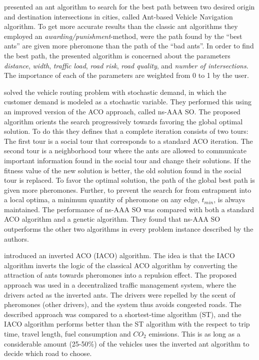 \citet{salehi-nezhad07} presented an ant algorithm to search for the best path between two desired origin and destination intersections in cities, called Ant-based Vehicle Navigation algorithm. To get more accurate results than the classic ant algorithms they employed an \textit{awarding/punishment}-method, were the path found by the ``best ants'' are given more pheromone than the path of the ``bad ants''. In order to find the best path, the presented algorithm is concerned about the parameters \textit{distance}, \textit{width}, \textit{traffic load}, \textit{road risk}, \textit{road quality}, and \textit{number of intersections}. The importance of each of the parameters are weighted from 0 to 1 by the user. 

\citet{tripathi09} solved the vehicle routing problem with stochastic demand, in which the customer demand is modeled as a stochastic variable. They performed this using an improved version of the ACO approach, called ns-AAA SO. The proposed algorithm orients the search progressively towards favoring the global optimal solution. To do this they defines that a complete iteration consists of two tours: The first tour is a social tour that corresponds to a standard ACO iteration. The second tour is a neighborhood tour where the ants are allowed to communicate important information found in the social tour and change their solutions. If the fitness value of the new solution is better, the old solution found in the social tour is replaced. To favor the optimal solution, the path of the global best path is given more pheromones. Further, to prevent the search for from entrapment into a local optima, a minimum quantity of pheromone on any edge, $t_{min}$, is always maintained. The performance of ns-AAA SO was compared with both a standard ACO algorithm and a genetic algorithm. They found that ns-AAA SO outperforms the other two algorithms in every problem instance described by the authors.

\citet{dias14} introduced an inverted ACO (IACO) algorithm. The idea is that the IACO algorithm inverts the logic of the classical ACO algorithm by converting the attraction of ants towards pheromones into a repulsion effect. The proposed approach was used in a decentralized traffic management system, where the drivers acted as the inverted ants. The drivers were repelled by the scent of pheromones (other drivers), and the system thus avoids congested roads. The described approach was compared to a shortest-time algorithm (ST), and the IACO algorithm performs better than the ST algorithm with the respect to trip time, travel length, fuel consumption and $CO_2$ emissions. This is as long as a considerable amount (25-50\%) of the vehicles uses the inverted ant algorithm to decide which road to choose. 

